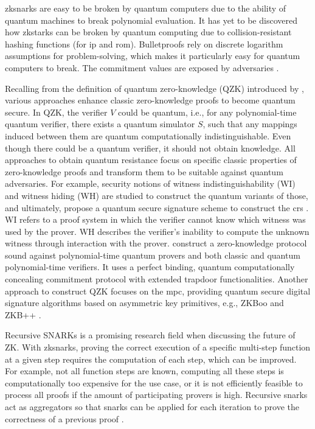 \acrshort{zksnark}s are easy to be broken by quantum computers due to the ability of quantum machines to break polynomial evaluation. It has yet to be discovered how \acrshort{zkstark}s can be broken by quantum computing due to collision-resistant hashing functions (for \acrshort{ip} and \acrshort{rom}). Bulletproofs rely on discrete logarithm assumptions for problem-solving, which makes it particularly easy for quantum computers to break. The commitment values are exposed by adversaries \citep{gongetal}. 

Recalling from the definition of quantum zero-knowledge (QZK) introduced by \citet{watrousqzk}, various approaches enhance classic zero-knowledge proofs to become quantum secure. In QZK, the verifier \(V\) could be quantum, i.e., for any polynomial-time quantum verifier, there exists a quantum simulator \(S\), such that any mappings induced between them are quantum computationally indistinguishable. Even though there could be a quantum verifier, it should not obtain knowledge. All approaches to obtain quantum resistance focus on specific classic properties of zero-knowledge proofs and transform them to be suitable against quantum adversaries. For example, security notions of witness indistinguishability (WI) and witness hiding (WH) are studied to construct the quantum variants of those, and ultimately, propose a quantum secure signature scheme to construct the \acrshort{crs} \citep{xieyang2019, katzetal}. WI refers to a proof system in which the verifier cannot know which witness was used by the prover. WH describes the verifier's inability to compute the unknown witness through interaction with the prover. \citet{Vidick2020classicalzero} construct a zero-knowledge protocol sound against polynomial-time quantum provers and both classic and quantum polynomial-time verifiers. It uses a perfect binding, quantum computationally concealing commitment protocol with extended trapdoor functionalities. Another approach to construct QZK focuses on the \acrshort{mpc}, providing quantum secure digital signature algorithms based on asymmetric key primitives, e.g., ZKBoo and ZKB++ \citep{gongetal}.

Recursive SNARKs is a promising research field when discussing the future of ZK. With \acrshort{zksnark}s, proving the correct execution of a specific multi-step function at a given step requires the computation of each step, which can be improved. For example, not all function steps are known, computing all these steps is computationally too expensive for the use case, or it is not efficiently feasible to process all proofs if the amount of participating provers is high. Recursive \acrshort{snark}s act as aggregators so that \acrshort{snark}s can be applied for each iteration to prove the correctness of a previous proof \citep{chen2022review}.

